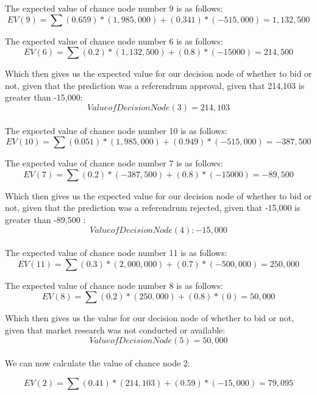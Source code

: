 \documentclass{article}
\begin{document}
 The expected value of chance node number 9 is as follows: 
\[
EV(9) = \sum (0.659) * (1,985,000) + (0.341) * (-515,000) = 1,132,500
\]

 The expected value of chance node number 6 is as follows: 
\[
EV(6) = \sum (0.2) * (1,132,500) + (0.8) * (-15000) = 214,500
\]

 Which then gives us the expected value for our decision node of whether to bid or not, given that the prediction was a referendrum approval, given that 214,103 is greater than -15,000: 
\[
Value of Decision Node (3) = 214,103
\] \\


 The expected value of chance node number 10 is as follows: 
\[
EV(10) = \sum (0.051) * (1,985,000) + (0.949) * (-515,000) = -387,500
\]

 The expected value of chance node number 7 is as follows: 
\[
EV(7) = \sum (0.2) * (-387,500) + (0.8) * (-15000) = -89,500
\]

 Which then gives us the expected value for our decision node of whether to bid or not, given that the prediction was a referendrum rejected, given that -15,000 is greater than -89,500 : 
\[
Value of Decision Node (4): -15,000
\] \\


 The expected value of chance node number 11 is as follows: 
\[
EV(11) = \sum (0.3) * (2,000,000) + (0.7) * (-500,000) = 250,000
\]

 The expected value of chance node number 8 is as follows: 
\[
EV(8) = \sum (0.2) * (250,000) + (0.8) * (0) = 50,000
\]

 Which then gives us the  value for our decision node of whether to bid or not, given that market research was not conducted or available: 
\[
Value of Decision Node (5) = 50,000
\] \\
We can now calculate the value of chance node 2:

\[
EV(2) = \sum (0.41)  * (214,103)  + (0.59) * (-15,000)  = 79,095
\]
\end{document}
